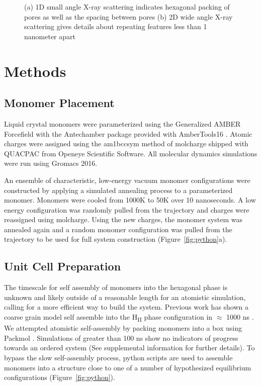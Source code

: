 \documentclass{article}
\begin{document}
\begin{figure}
\begin{subfigure}[t]{0.47\linewidth}
{                }
                \caption{}\label{fig:WAXS}
        \end{subfigure}
        \caption{(a) 1D small angle X-ray scattering indicates hexagonal packing of
        pores as well as the spacing between pores (b) 2D wide angle X-ray scattering
        gives details about repeating features less than 1 nanometer apart}\label{fig:SWAXS}
  \end{figure}

  \section*{Methods}
 
  \subsection*{Monomer Placement}

  Liquid crystal monomers were parameterized using the Generalized AMBER
  Forcefield \cite{wang_development_2004} with the Antechamber package
  \cite{wang_automatic_2006} provided with AmberTools16
  \cite{case_ambertools16_2016}. Atomic charges were assigned using the am1bccsym
  method of molcharge shipped with QUACPAC from Openeye Scientific Software. All
  molecular dynamics simulations were run using Gromacs 2016.
  \cite{bekker_gromacs:_1993,berendsen_gromacs:_1995,van_der_spoel_gromacs:_2005,hess_gromacs_2008}

  An ensemble of characteristic, low-energy vacuum monomer configurations
  were constructed by applying a simulated annealing process to a parameterized
  monomer. Monomers were cooled from 1000K to 50K over 10 nanoseconds.  A low
  energy configuration was randomly pulled from the trajectory and charges were
  reassigned using molcharge.  Using the new charges, the monomer system was
  annealed again and a random monomer configuration was pulled from the
  trajectory to be used for full system construction (Figure~\ref{fig:python}a).

  \subsection*{Unit Cell Preparation}

  The timescale for self assembly of monomers into the hexagonal phase is
  unknown and likely outside of a reasonable length for an atomistic
  simulation, calling for a more efficient way to build the system.  Previous
  work has shown a coarse grain model self assemble into the H\textsubscript{II}
  phase configuration in $\approx$ 1000 ns \cite{mondal_self-assembly_2013}.  We
  attempted atomistic self-assembly by packing monomers into a box using Packmol
  \cite{martinez_packmol:_2009}.  Simulations of greater than 100 ns show no
  indicators of progress towards an ordered system (See supplemental information
  for further details). To bypass the slow self-assembly process, python scripts
  are used to assemble monomers into a structure close to one of a number of
  hypothesized equilibrium configurations (Figure~\ref{fig:python}).
\end{document}
